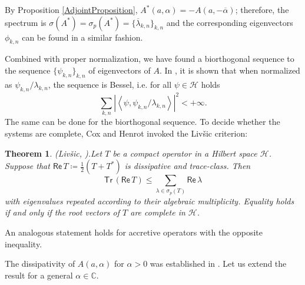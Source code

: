 \documentclass[11pt, a4paper,reqno]{amsart}
\theoremstyle{plain}
\newtheorem{theorem}{{Theorem}}[section]
\newtheorem{proposition}[theorem]{Proposition}
\theoremstyle{definition}
\theoremstyle{remark}
\newcommand{\inner}[2]{\left\langle{#1}, {#2}\right\rangle}
\renewcommand{\leq}{\leqslant}	\renewcommand{\geq}{\geqslant}
\newcommand{\1}{\mathds 1}
\renewcommand{\Re}{\mathsf{Re}\,}
\newcommand{\Tr}{\mathsf{Tr}\,}
\renewcommand{\deg}{\mathsf{deg}\,}
\begin{document}


By Proposition \ref{AdjointProposition}, $A^\ast(a, \alpha) = - A(a, -\overline \alpha)$; therefore, the spectrum is $\sigma(A^\ast) = \sigma_p(A^\ast) = \{\overline\lambda_{k,n}\}_{k,n}$ and the corresponding eigenvectors $\phi_{k,n}$ can be found in a similar fashion.

Combined with proper normalization, we have found a biorthogonal sequence to the sequence $\{\psi_{k,n}\}_{k,n}$ of eigenvectors of $A$. In \cite{CH}, it is shown that when normalized as $\psi_{k,n}/\lambda_{k,n}$, the sequence is Bessel, i.e. for all $\psi \in \mathcal H$ holds
\[
\sum_{k,n}\left|\inner{\psi}{\psi_{k,n}/\lambda_{k,n}}\right|^2 < +\infty.
\]
The same can be done for the biorthogonal sequence. To decide whether the systems are complete, Cox and Henrot invoked the Livšic criterion:

\begin{theorem} (Livšic, \cite[Theorem V.2.1]{GohbergKrein}).\label{Livšic}
    Let $T$ be a compact operator in a Hilbert space $\mathcal H$. Suppose that $\Re T \coloneqq \frac{1}{2}(T+T^\ast)$ is dissipative and trace-class. Then
    \[
    \Tr(\Re T) \leq \sum_{\lambda\in \sigma_p(T)}\Re  \lambda
    \]
    with eigenvalues repeated according to their algebraic multiplicity. Equality holds if and only if the root vectors of $T$ are complete in $\mathcal H$.
\end{theorem}

An analogous statement holds for accretive operators with the opposite inequality.

The dissipativity of $A(a, \alpha)$ for $\alpha > 0$ was established in \cite{BRT}. Let us extend the result for a general $\alpha \in \mathbb C.$
\end{document}
